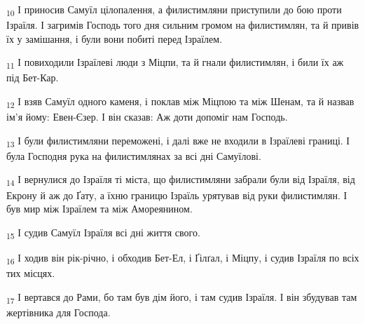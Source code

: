 \begin{tcolorbox}
\textsubscript{10} І приносив Самуїл цілопалення, а филистимляни приступили до бою проти Ізраїля. І загримів Господь того дня сильним громом на филистимлян, та й привів їх у замішання, і були вони побиті перед Ізраїлем.
\end{tcolorbox}
\begin{tcolorbox}
\textsubscript{11} І повиходили Ізраїлеві люди з Міцпи, та й гнали филистимлян, і били їх аж під Бет-Кар.
\end{tcolorbox}
\begin{tcolorbox}
\textsubscript{12} І взяв Самуїл одного каменя, і поклав між Міцпою та між Шенам, та й назвав ім'я йому: Евен-Єзер. І він сказав: Аж доти допоміг нам Господь.
\end{tcolorbox}
\begin{tcolorbox}
\textsubscript{13} І були филистимляни переможені, і далі вже не входили в Ізраїлеві границі. І була Господня рука на филистимлянах за всі дні Самуїлові.
\end{tcolorbox}
\begin{tcolorbox}
\textsubscript{14} І вернулися до Ізраїля ті міста, що филистимляни забрали були від Ізраїля, від Екрону й аж до Ґату, а їхню границю Ізраїль урятував від руки филистимлян. І був мир між Ізраїлем та між Амореянином.
\end{tcolorbox}
\begin{tcolorbox}
\textsubscript{15} І судив Самуїл Ізраїля всі дні життя свого.
\end{tcolorbox}
\begin{tcolorbox}
\textsubscript{16} І ходив він рік-річно, і обходив Бет-Ел, і Ґілґал, і Міцпу, і судив Ізраїля по всіх тих місцях.
\end{tcolorbox}
\begin{tcolorbox}
\textsubscript{17} І вертався до Рами, бо там був дім його, і там судив Ізраїля. І він збудував там жертівника для Господа.
\end{tcolorbox}
